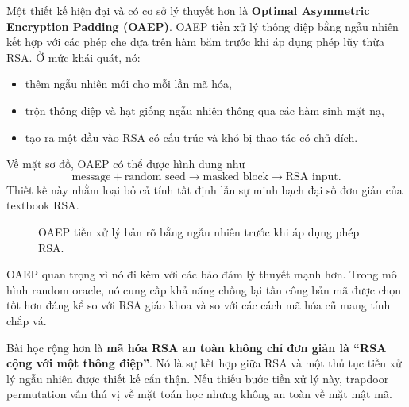 Một thiết kế hiện đại và có cơ sở lý thuyết hơn là \textbf{Optimal Asymmetric Encryption Padding (OAEP)}. OAEP tiền xử lý thông điệp bằng ngẫu nhiên kết hợp với các phép che dựa trên hàm băm trước khi áp dụng phép lũy thừa RSA. Ở mức khái quát, nó:

\begin{itemize}
\item thêm ngẫu nhiên mới cho mỗi lần mã hóa,
\item trộn thông điệp và hạt giống ngẫu nhiên thông qua các hàm sinh mặt nạ,
\item tạo ra một đầu vào RSA có cấu trúc và khó bị thao tác có chủ đích.
\end{itemize}

Về mặt sơ đồ, OAEP có thể được hình dung như
\[
\text{message} + \text{random seed}
\longrightarrow
\text{masked block}
\longrightarrow
\text{RSA input}.
\]
Thiết kế này nhằm loại bỏ cả tính tất định lẫn sự minh bạch đại số đơn giản của textbook RSA.

\begin{figure}[h]
\centering
{}
\caption{OAEP tiền xử lý bản rõ bằng ngẫu nhiên trước khi áp dụng phép RSA.}
\end{figure}

OAEP quan trọng vì nó đi kèm với các bảo đảm lý thuyết mạnh hơn. Trong mô hình random oracle, nó cung cấp khả năng chống lại tấn công bản mã được chọn tốt hơn đáng kể so với RSA giáo khoa và so với các cách mã hóa cũ mang tính chắp vá.

Bài học rộng hơn là \textbf{mã hóa RSA an toàn không chỉ đơn giản là ``RSA cộng với một thông điệp''}. Nó là sự kết hợp giữa RSA và một thủ tục tiền xử lý ngẫu nhiên được thiết kế cẩn thận. Nếu thiếu bước tiền xử lý này, trapdoor permutation vẫn thú vị về mặt toán học nhưng không an toàn về mặt mật mã.
